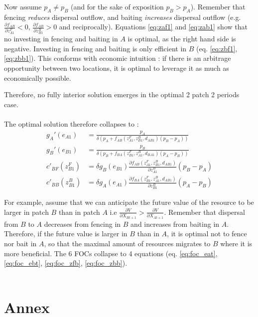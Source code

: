 \documentclass{article}
\begin{document}
Now assume $p_A \neq p_B$ (and for the sake of exposition $p_B > p_A$). Remember that fencing \textit{reduces} dispersal outflow, and baiting \textit{increases} dispersal outflow (e.g. $\frac{\partial f_{AB}}{\partial z_{A1}^F}<0$, $\frac{\partial f_{AB}}{\partial z_{B1}^B}>0$ and reciprocally). Equations \ref{eq:zaf1} and \ref{eq:zab1} show that no investing  in fencing and baiting in $A$ is optimal, as the right hand side is negative. Investing in fencing and baiting is only efficient in $B$ (eq. \ref{eq:zbf1}, \ref{eq:zbb1}). This conforms with economic intuition : if there is an arbitrage opportunity between two locations, it is optimal to leverage it as much as economically possible.

Therefore, no fully interior solution emerges in the optimal 2 patch 2 periods case. \\\\

The optimal solution therefore collapses to : 
\begin{align*}
g_A'(e_{A1}) &= \frac{p_A}{\delta \left(p_A + f_{AB}(z_{A1}^F, z_{B1}^B, d_{AB1})(p_B-p_A)\right)} \\
%
g_B'(e_{B1}) &= \frac{p_B}{\delta \left( p_B + f_{BA}(z_{B1}^F, z_{A1}^B, d_{BA1})(p_A-p_B)\right)} \\
%
c'_{BF}(z_{B1}^F) &= \delta g_B(e_{B1}) \frac{\partial f_{AB}(z_{A1}^F, z_{B1}^B, d_{AB1})}{\partial z_{A1}^B}(p_B - p_A) \\
%
c'_{BB}(z_{B1}^B) & = \delta g_A(e_{A1}) \frac{\partial f_{BA}(z_{B1}^F, z_{A1}^B, d_{AB1})}{\partial z_{B1}^B}(p_{A} - p_{B})
\end{align*}


 For example, assume that we can anticipate the future value of the resource to be larger in patch $B$ than in patch $A$ i.e $\frac{\partial V}{\partial X_{Bt+1}}> \frac{\partial V}{\partial X_{At+1}}$. Remember that dispersal from $B$ to $A$ decreases from fencing in $B$ and increases from baiting in $A$. Therefore, if the future value is larger in $B$ than in $A$, it is optimal not to fence nor bait in $A$, so that the maximal amount of resources migrates to $B$ where it is more beneficial. The 6 FOCs collapse to 4 equations (eq. \ref{eq:foc_eat},\ref{eq:foc_ebt}, \ref{eq:foc_zfb}, \ref{eq:foc_zbb}).
\\\\
\section*{Annex}
\end{document}
